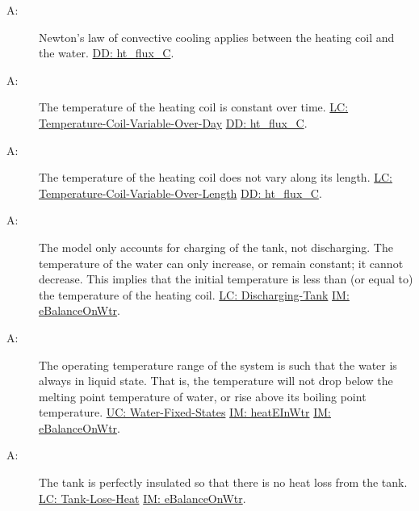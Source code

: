 \documentclass[12pt]{article}
\newcounter{assumpnum}
\newcommand{\atheassumpnum}{A\theassumpnum}
\begin{document}
\begin{description}
\item[\atheassumpnum\label{A:Newton-Law-Convective-Cooling-Coil-Water}:]Newton's law of convective cooling applies between the heating coil and the water. \hyperref[DD:ht.flux.C]{DD: ht\_flux\_C}.
\end{description}
\begin{description}
\item[\atheassumpnum\label{A:Temp-Heating-Coil-Constant-over-Time}:]The temperature of the heating coil is constant over time. \hyperref[likeChgTCVOD]{LC: Temperature-Coil-Variable-Over-Day} \hyperref[DD:ht.flux.C]{DD: ht\_flux\_C}.
\end{description}
\begin{description}
\item[\atheassumpnum\label{A:Temp-Heating-Coil-Constant-over-Length}:]The temperature of the heating coil does not vary along its length. \hyperref[likeChgTCVOL]{LC: Temperature-Coil-Variable-Over-Length} \hyperref[DD:ht.flux.C]{DD: ht\_flux\_C}.
\end{description}
\begin{description}
\item[\atheassumpnum\label{A:Charging-Tank-No-Temp-Discharge}:]The model only accounts for charging of the tank, not discharging. The temperature of the water can only increase, or remain constant; it cannot decrease. This implies that the initial temperature is less than (or equal to) the temperature of the heating coil. \hyperref[likeChgDT]{LC: Discharging-Tank} \hyperref[IM:eBalanceOnWtr]{IM: eBalanceOnWtr}.
\end{description}
\begin{description}
\item[\atheassumpnum\label{A:Water-Always-Liquid}:]The operating temperature range of the system is such that the water is always in liquid state. That is, the temperature will not drop below the melting point temperature of water, or rise above its boiling point temperature. \hyperref[unlikeChgWFS]{UC: Water-Fixed-States} \hyperref[IM:heatEInWtr]{IM: heatEInWtr} \hyperref[IM:eBalanceOnWtr]{IM: eBalanceOnWtr}.
\end{description}
\begin{description}
\item[\atheassumpnum\label{A:Perfect-Insulation-Tank}:]The tank is perfectly insulated so that there is no heat loss from the tank. \hyperref[likeChgTLH]{LC: Tank-Lose-Heat} \hyperref[IM:eBalanceOnWtr]{IM: eBalanceOnWtr}.
\end{description}
\end{document}
